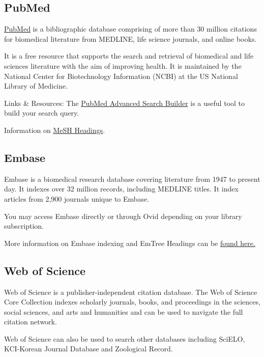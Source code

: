\documentclass[
]{book}
\begin{document}
\hypertarget{pubmed}{%
\subsection{PubMed}\label{pubmed}}

\href{https://pubmed.ncbi.nlm.nih.gov/}{PubMed} is a bibliographic database comprising of more than 30 million citations for biomedical literature from MEDLINE, life science journals, and online books.

It is a free resource that supports the search and retrieval of biomedical and life sciences literature with the aim of improving health. It is maintained by the National Center for Biotechnology Information (NCBI) at the US National Library of Medicine.

Links \& Resources:
The \href{https://www.ncbi.nlm.nih.gov/pubmed/advanced}{PubMed Advanced Search Builder} is a useful tool to build your search query.

Information on \href{https://www.nlm.nih.gov/mesh/meshhome.html}{MeSH Headings}.

\hypertarget{embase}{%
\subsection{Embase}\label{embase}}

Embase is a biomedical research database covering literature from 1947 to present day. It indexes over 32 million records, including MEDLINE titles. It index articles from 2,900 journals unique to Embase.

You may access Embase directly or through Ovid depending on your library subscription.

More information on Embase indexing and EmTree Headings can be \href{https://www.elsevier.com/solutions/embase-biomedical-research/embase-coverage-and-content}{found here.}

\hypertarget{web-of-science}{%
\subsection{Web of Science}\label{web-of-science}}

Web of Science is a publisher-independent citation database. The Web of Science Core Collection indexes scholarly journals, books, and proceedings in the sciences, social sciences, and arts and humanities and can be used to navigate the full citation network.

Web of Science can also be used to search other databases including SciELO, KCI-Korean Journal Database and Zoological Record.
\end{document}

